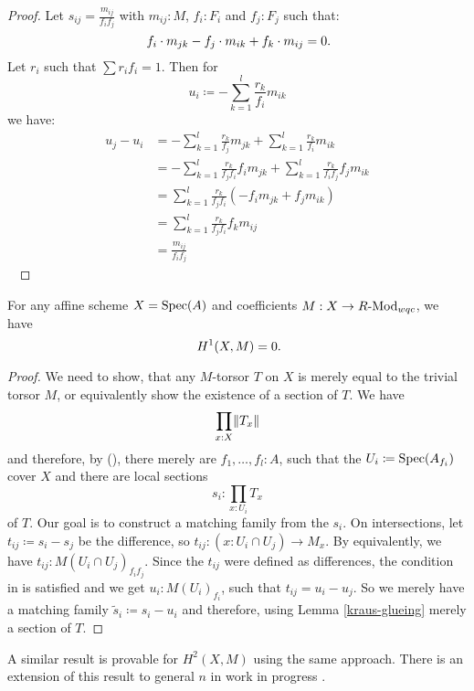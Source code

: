 \begin{proof}
  Let $s_{ij}=\frac{m_{ij}}{f_i f_j}$ with $m_{ij}:M$, $f_i:F_i$ and $f_j:F_j$ such that:
  \[ f_i\cdot m_{jk}-f_j\cdot m_{ik}+f_k\cdot m_{ij}=0 \rlap{.}\]
  Let $r_i$ such that $\sum r_i f_i =1$.
  Then for
  \[ u_i \coloneqq -\sum_{k=1}^l\frac{r_k}{f_i}m_{ik} \]
  we have:
  \begin{align*}
      u_j-u_i &= -\sum_{k=1}^l\frac{r_k}{f_j}m_{jk} + \sum_{k=1}^l\frac{r_k}{f_i}m_{ik} \\
              &= -\sum_{k=1}^l\frac{r_k}{f_j f_i}f_i m_{jk} + \sum_{k=1}^l\frac{r_k}{f_i f_j} f_j m_{ik} \\
              &= \sum_{k=1}^l\frac{r_k}{f_j f_i}(-f_i m_{jk} + f_j m_{ik}) \\
              &= \sum_{k=1}^l\frac{r_k}{f_j f_i}f_k m_{ij} \\
              &= \frac{m_{ij}}{f_i f_j}
  \end{align*}
  \ %
\end{proof}

\begin{theorem}%
  \label{H1-wqc-module-affine-trivial}
  For any affine scheme $X=\operatorname{Spec}(A)$ and coefficients $M: X\to R\text{-}\mathrm{Mod}_{wqc}$, we have
  \[ H^1(X,M)=0 \rlap{.} \]
\end{theorem}

\begin{proof}
  We need to show, that any $M$-torsor $T$ on $X$ is merely equal to the trivial torsor $M$,
  or equivalently show the existence of a section of $T$.
  We have
  \[ \prod_{x:X}\lVert  T_x  \rVert\]
  and therefore, by (),
  there merely are $f_1,\dots,f_l:A$,
  such that the $U_i\coloneqq \operatorname{Spec}(A_{f_i})$ cover $X$ and
  there are local sections
  \[ s_i:\prod_{x:U_i}T_x\]
  of $T$. Our goal is to construct a matching family from the $s_i$.
  On intersections, let $t_{ij}\coloneqq s_i-s_j$ be the difference, so $t_{ij}:(x : U_i\cap U_j) \to M_x$.
  By  equivalently,
  we have $t_{ij}:M(U_{i}\cap U_j)_{f_i f_j}$.
  Since the $t_{ij}$ were defined as differences,
  the condition in  is satisfied and we get
  $u_i:M(U_i)_{f_i}$, such that $t_{ij}=u_i-u_j$.
  So we merely have a matching family $\tilde{s}_i\coloneqq s_i-u_i$ and therefore, using Lemma \ref{kraus-glueing} merely a section of $T$.
\end{proof}

A similar result is provable for $H^2(X,M)$ using the same approach.
There is an extension of this result to general $n$ in work in progress \cite{cech-draft}.

